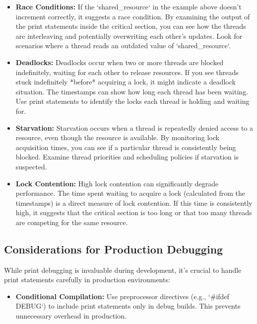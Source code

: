 \documentclass{article}
\begin{document}
{{{\begin{itemize}
    \item \textbf{Race Conditions:} If the `shared_resource` in the example above doesn't increment correctly, it suggests a race condition. By examining the output of the print statements inside the critical section, you can see how the threads are interleaving and potentially overwriting each other's updates. Look for scenarios where a thread reads an outdated value of `shared_resource`.

    \item \textbf{Deadlocks:} Deadlocks occur when two or more threads are blocked indefinitely, waiting for each other to release resources.  If you see threads stuck indefinitely *before* acquiring a lock, it might indicate a deadlock situation. The timestamps can show how long each thread has been waiting. Use print statements to identify the locks each thread is holding and waiting for.

    \item \textbf{Starvation:} Starvation occurs when a thread is repeatedly denied access to a resource, even though the resource is available.  By monitoring lock acquisition times, you can see if a particular thread is consistently being blocked. Examine thread priorities and scheduling policies if starvation is suspected.

    \item \textbf{Lock Contention:} High lock contention can significantly degrade performance.  The time spent waiting to acquire a lock (calculated from the timestamps) is a direct measure of lock contention.  If this time is consistently high, it suggests that the critical section is too long or that too many threads are competing for the same resource.
\end{itemize}

\subsection*{Considerations for Production Debugging}

While print debugging is invaluable during development, it's crucial to handle print statements carefully in production environments:

\begin{itemize}
    \item \textbf{Conditional Compilation:} Use preprocessor directives (e.g., `#ifdef DEBUG`) to include print statements only in debug builds. This prevents unnecessary overhead in production.


\end{itemize}}}}
\end{document}
